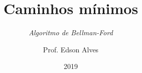 \title{Caminhos mínimos}
\subtitle{\textit{Algoritmo de Bellman-Ford}}
\date{2019}
\author{Prof. Edson Alves}
